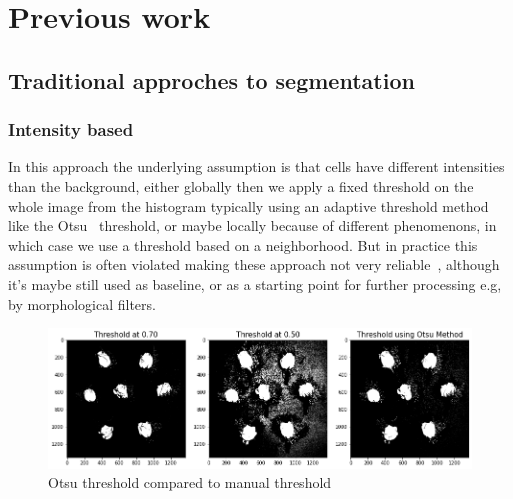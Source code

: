 \documentclass[main.tex]{subfiles}
\begin{document}
\chapter{Previous work}

\section{Traditional approches to segmentation}
\subsection{Intensity based}


In this approach the underlying assumption is that cells have different intensities than the background, either globally then we apply a fixed threshold on the whole image from the histogram typically using an adaptive threshold method like the Otsu~\cite{Otsu1979} threshold, or maybe locally because of different phenomenons, in which case we use a threshold based on a neighborhood. But in practice this assumption is often violated making these approach not very reliable~\cite{Bengtsson2004}, although it's maybe still used as baseline, or as a starting point for further processing e.g, by morphological filters. \\

\begin{figure}[H]
    \centering
    \includegraphics[width=12cm]{images/otsu.png}
    \caption{Otsu threshold compared to manual threshold}
    \label{fig:otsu}
\end{figure}
\end{document}

